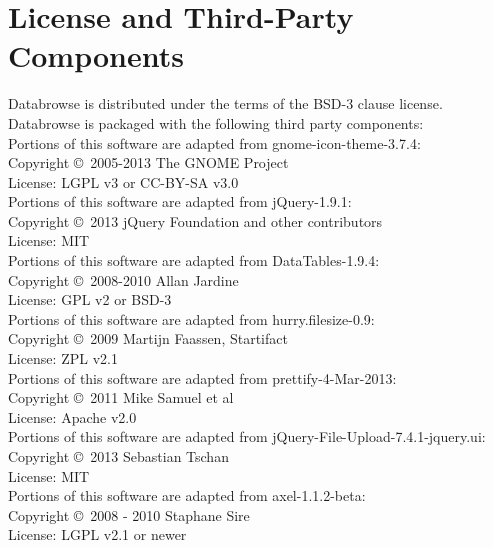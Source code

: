 \documentclass[10pt]{article}
\begin{document}
\clearpage
\section{License and Third-Party Components}
Databrowse is distributed under the terms of the BSD-3 clause license. \\

\noindent Databrowse is packaged with the following third party components: \\

\noindent Portions of this software are adapted from gnome-icon-theme-3.7.4: \\
Copyright \copyright\ 2005-2013 The GNOME Project \\
License: LGPL v3 or CC-BY-SA v3.0 \\

\noindent Portions of this software are adapted from jQuery-1.9.1: \\
Copyright \copyright\ 2013 jQuery Foundation and other contributors \\
License: MIT \\

\noindent Portions of this software are adapted from DataTables-1.9.4: \\
Copyright \copyright\ 2008-2010 Allan Jardine \\
License: GPL v2 or BSD-3 \\

\noindent Portions of this software are adapted from hurry.filesize-0.9: \\
Copyright \copyright\ 2009 Martijn Faassen, Startifact \\
License: ZPL v2.1 \\

\noindent Portions of this software are adapted from prettify-4-Mar-2013: \\
Copyright \copyright\ 2011 Mike Samuel et al \\
License: Apache v2.0 \\

\noindent Portions of this software are adapted from jQuery-File-Upload-7.4.1-jquery.ui: \\
Copyright \copyright\ 2013 Sebastian Tschan \\
License: MIT \\

\noindent Portions of this software are adapted from axel-1.1.2-beta: \\
Copyright \copyright\ 2008 - 2010 Staphane Sire \\
License: LGPL v2.1 or newer \\
\end{document}
